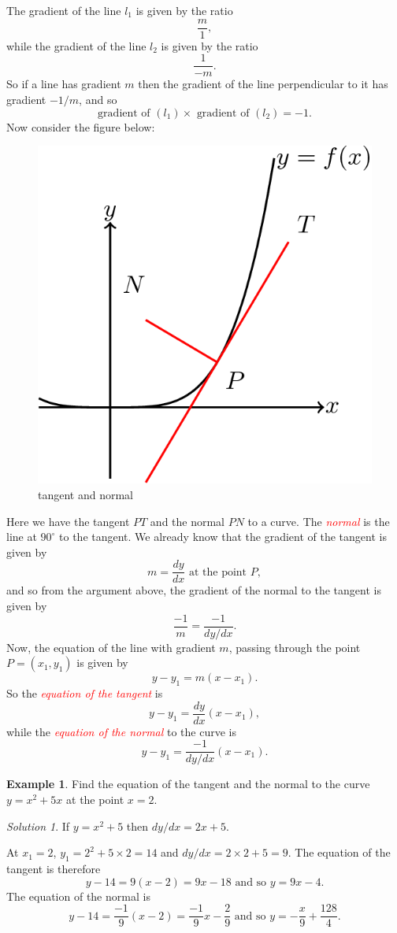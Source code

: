 \documentclass[
  11pt,
  oneside]{book}
\newcommand{\slide}{}
\theoremstyle{definition}
\theoremstyle{definition}
\newtheorem{example}{Example}[chapter]
\theoremstyle{definition}
\theoremstyle{definition}
\theoremstyle{remark}
\newtheorem*{solution}{Solution}
\begin{document}
The gradient of the line \(l_1\) is given by the ratio
\[
\frac{m}{1},
\]
while the gradient of the line \(l_2\) is given by the ratio
\[
\frac{1}{-m}.
\]
So if a line has gradient \(m\) then the gradient of the line perpendicular to it has gradient \(-1/m\), and so
\[
\text{gradient of }(l_1) \times \text{ gradient of }(l_2) = -1.
\]
Now consider the figure below:

\begin{figure}

{\centering \includegraphics[width=0.35\linewidth]{tikztopng-figure5} 

}

\caption{tangent and normal}\label{fig:unnamed-chunk-14}
\end{figure}

Here we have the tangent \(PT\) and the normal \(PN\) to a curve. The \textcolor{red}{\em normal} is the line at \(90^\circ\) to the tangent. We already know that the gradient of the tangent is given by
\[
m = \frac{dy}{dx}\text{ at the point }P,
\]
and so from the argument above, the gradient of the normal to the tangent is given by
\[
\frac{-1}{m} = \frac{-1}{dy/dx}.
\]
Now, the equation of the line with gradient \(m\), passing through the point \(P=(x_1,y_1)\) is given by
\[
y-y_1 = m(x-x_1).
\]
So the \textcolor{red}{\em equation of the tangent} is
\[
y - y_1 = \frac{dy}{dx}(x-x_1),
\]
while the \textcolor{red}{\em equation of the normal} to the curve is
\[
y - y_1 = \frac{-1}{dy/dx}(x-x_1).
\]
\slide

\begin{example}
Find the equation of the tangent and the normal to the curve \(y = x^2+5x\) at the point \(x=2\).
\end{example}

\begin{solution}
If \(y=x^2+5\) then \(dy/dx = 2x+5\).

At \(x_1=2\), \(y_1 = 2^2 + 5\times2 = 14\) and \(dy/dx = 2\times2+5=9\).
The equation of the tangent is therefore
\[
y-14=9(x-2) = 9x - 18\text{ and so }y = 9x-4.
\]
The equation of the normal is
\[
y-14=\frac{-1}{9}(x-2) = \frac{-1}{9}x - \frac{2}{9}\text{ and so }y = -\frac{x}{9}+\frac{128}{4}.
\]
\end{solution}
\end{document}
